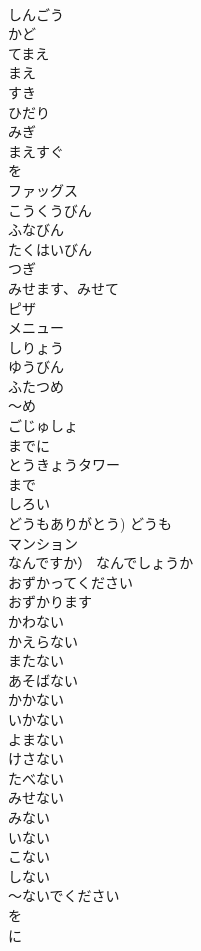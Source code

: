 \documentclass[8pt]{extreport}
\begin{document}
\begin{CJK}{UTF8}{min}
\\	しんごう		
\\	かど		
\\	てまえ		
\\	まえ		
\\	すき		
\\	ひだり		
\\	みぎ		
\\	まえすぐ		
\\	を		
\\	ファッグス		
\\	こうくうびん		
\\	ふなびん		
\\	たくはいびん		
\\	つぎ		
\\	みせます、みせて		
\\	ピザ		
\\	メニュー		
\\	しりょう		
\\	ゆうびん		
\\	ふたつめ		
\\	〜め		
\\	ごじゅしょ		
\\	までに		
\\	とうきょうタワー		
\\	まで		
\\	しろい		
\\	どうもありがとう)	どうも		
\\	マンション		
\\	なんですか）	なんでしょうか		
\\	おずかってください		
\\	おずかります		
\\	かわない		
\\	かえらない		
\\	またない		
\\	あそばない		
\\	かかない		
\\	いかない		
\\	よまない		
\\	けさない		
\\	たべない		
\\	みせない		
\\	みない		
\\	いない		
\\	こない		
\\	しない		
\\	〜ないでください		
\\	を		
\\	に		

\end{CJK}
\end{document}

